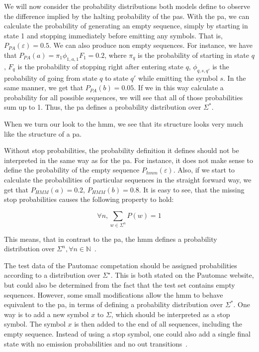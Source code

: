 We will now consider the probability distributions both models define to observe the difference implied by the halting probability of the \glspl{pa}.
With the \gls{pa}, we can calculate the probability of generating an empty sequence, simply by starting in state 1 and stopping immediately before emitting any symbols. That is, $P_{PA}(\varepsilon) = 0.5$. We can also produce non empty sequences. For instance, we have that $P_{PA}(a) = \pi_1\phi_{1,a,1}F_1 = 0.2$, where $\pi_q$ is the probability of starting in state $q$, $F_q$ is the probability of stopping right after entering state $q$, $\phi_{q,s,q'}$ is the probability of going from state $q$ to state $q'$ while emitting the symbol $s$.
In the same manner, we get that $P_{PA}(b) = 0.05$.
If we in this way calculate a probability for all possible sequences, we will see that all of those probabilities sum up to 1. Thus, the \gls{pa} defines a probability distribution over $\Sigma^\ast$\cite{Dupont:2005:LPA:1746577.1746601}.

When we turn our look to the \gls{hmm}, we see that its structure looks very much like the structure of a \gls{pa}.

Without stop probabilities, the probability definition it defines should not be interpreted in the same way as for the \gls{pa}. For instance, it does not make sense to define the probability of the empty sequence $P_{hmm}(\varepsilon)$. Also, if we start to calculate the probabilities of particular sequences in the straight forward way, we get that $P_{HMM}(a) = 0.2$, $P_{HMM}(b) = 0.8$. It is easy to see, that the missing stop probabilities causes the following property to hold:

\[\forall n, \sum_{w \in \Sigma^n} P(w) = 1\]

This means, that in contrast to the \gls{pa}, the \gls{hmm} defines a probability distribution over $\Sigma^n, \forall n \in \mathbb{N}$~\cite{Dupont:2005:LPA:1746577.1746601}.

The test data of the Pautomac competation should be assigned probabilities according to a distribution over $\Sigma^\star$.
This is both stated on the Pautomac website, but could also be determined from the fact that the test set contains empty sequences. However, some small modifications allow the \gls{hmm} to behave equivalent to the \gls{pa}, in terms of defining a probability distribution over $\Sigma^\ast$. One way is to add a new symbol $x$ to $\Sigma$, which should be interpreted as a stop symbol. The symbol $x$ is then added to the end of all sequences, including the empty sequence. Instead of using a stop symbol, one could also add a single final state with no emission probabilities and no out transitions~\cite{Dupont:2005:LPA:1746577.1746601}.
